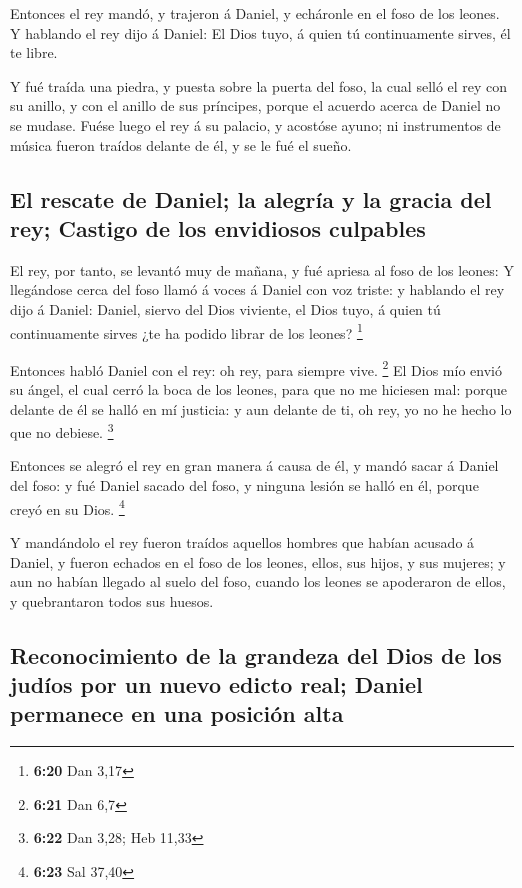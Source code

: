  Entonces el rey mandó, y trajeron á Daniel, y echáronle en
el foso de los leones. Y hablando el rey dijo á Daniel: El Dios tuyo, á
quien tú continuamente sirves, él te libre.

 Y fué traída una piedra, y puesta sobre la puerta del
foso, la cual selló el rey con su anillo, y con el anillo de sus
príncipes, porque el acuerdo acerca de Daniel no se mudase.
 Fuése luego el rey á su palacio, y acostóse ayuno; ni
instrumentos de música fueron traídos delante de él, y se le fué el
sueño.

\hypertarget{el-rescate-de-daniel-la-alegruxeda-y-la-gracia-del-rey-castigo-de-los-envidiosos-culpables}{%
\subsection{El rescate de Daniel; la alegría y la gracia del rey;
Castigo de los envidiosos
culpables}\label{el-rescate-de-daniel-la-alegruxeda-y-la-gracia-del-rey-castigo-de-los-envidiosos-culpables}}

 El rey, por tanto, se levantó muy de mañana, y fué apriesa
al foso de los leones:  Y llegándose cerca del foso llamó á
voces á Daniel con voz triste: y hablando el rey dijo á Daniel: Daniel,
siervo del Dios viviente, el Dios tuyo, á quien tú continuamente sirves
¿te ha podido librar de los leones? \footnote{\textbf{6:20} Dan 3,17}

 Entonces habló Daniel con el rey: oh rey, para siempre
vive. \footnote{\textbf{6:21} Dan 6,7}  El Dios mío envió
su ángel, el cual cerró la boca de los leones, para que no me hiciesen
mal: porque delante de él se halló en mí justicia: y aun delante de ti,
oh rey, yo no he hecho lo que no debiese. \footnote{\textbf{6:22} Dan
  3,28; Heb 11,33}

 Entonces se alegró el rey en gran manera á causa de él, y
mandó sacar á Daniel del foso: y fué Daniel sacado del foso, y ninguna
lesión se halló en él, porque creyó en su Dios. \footnote{\textbf{6:23}
  Sal 37,40}

 Y mandándolo el rey fueron traídos aquellos hombres que
habían acusado á Daniel, y fueron echados en el foso de los leones,
ellos, sus hijos, y sus mujeres; y aun no habían llegado al suelo del
foso, cuando los leones se apoderaron de ellos, y quebrantaron todos sus
huesos.

\hypertarget{reconocimiento-de-la-grandeza-del-dios-de-los-juduxedos-por-un-nuevo-edicto-real-daniel-permanece-en-una-posiciuxf3n-alta}{%
\subsection{Reconocimiento de la grandeza del Dios de los judíos por un
nuevo edicto real; Daniel permanece en una posición
alta}\label{reconocimiento-de-la-grandeza-del-dios-de-los-juduxedos-por-un-nuevo-edicto-real-daniel-permanece-en-una-posiciuxf3n-alta}}

